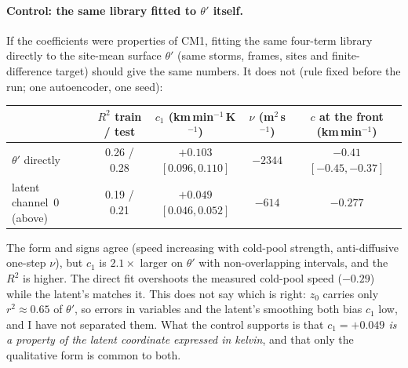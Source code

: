 \documentclass[11pt]{article}
\begin{document}
\paragraph{Control: the same library fitted to $\theta'$ itself.} If the coefficients were properties of CM1, fitting the same four-term library directly to the site-mean surface $\theta'$ (same storms, frames, sites and finite-difference target) should give the same numbers. It does not (rule fixed before the run; one autoencoder, one seed):
\begin{center}\small
\begin{tabular}{lcccc}\toprule
 & $R^2$ train / test & $c_1$ (km\,min$^{-1}$\,K$^{-1}$) & $\nu$ (m$^2$\,s$^{-1}$) & $c$ at the front (km\,min$^{-1}$)\\\midrule
$\theta'$ directly & 0.26 / 0.28 & $+0.103$ $[0.096, 0.110]$ & $-2344$ & $-0.41$ $[-0.45, -0.37]$\\
latent channel~0 (above) & 0.19 / 0.21 & $+0.049$ $[0.046, 0.052]$ & $-614$ & $-0.277$\\\bottomrule
\end{tabular}\end{center}
The form and signs agree (speed increasing with cold-pool strength, anti-diffusive one-step $\nu$), but $c_1$ is $2.1\times$ larger on $\theta'$ with non-overlapping intervals, and the $R^2$ is higher. The direct fit overshoots the measured cold-pool speed ($-0.29$) while the latent's matches it. This does not say which is right: $z_0$ carries only $r^2 \approx 0.65$ of $\theta'$, so errors in variables and the latent's smoothing both bias $c_1$ low, and I have not separated them. What the control supports is that \emph{$c_1 = +0.049$ is a property of the latent coordinate expressed in kelvin}, and that only the qualitative form is common to both.
\end{document}
